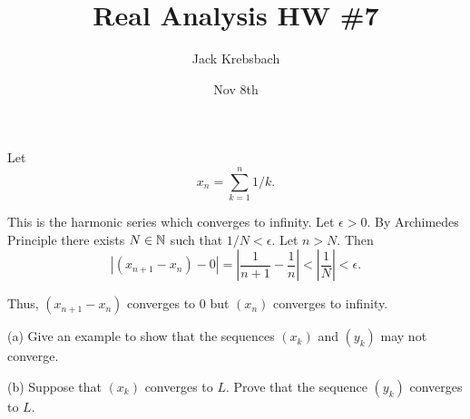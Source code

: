 \documentclass{report}
\title{Real Analysis HW \#7}
\author{Jack Krebsbach }
\date{Nov 8th}
\begin{document}
\maketitle
{}

\sol
Let $$x_n= \sum_{k=1}^{n} 1/k.$$

This is the harmonic series which converges to infinity. Let $\epsilon>0.$ By Archimedes Principle there exists $N \in \NN$ such that $1/N < \epsilon.$ Let $n>N.$ Then $$|(x_{n+1} - x_n) -0 | = \left|\frac{1}{n+1} - \frac{1}{n}\right| < \left|\frac{1}{N} \right| < \epsilon.$$

Thus, $\left(x_{n+1}-x_n\right)$ converges to 0 but $(x_n)$ converges to infinity.

\bigskip
{}

\bigskip
(a) Give an example to show that the sequences $\left(x_k\right)$ and $\left(y_k\right)$ may not converge.

\bigskip
\bigskip
\bigskip
(b) Suppose that $\left(x_k\right)$ converges to $L$. Prove that the sequence $\left(y_k\right)$ converges to $L$.
\end{document}
